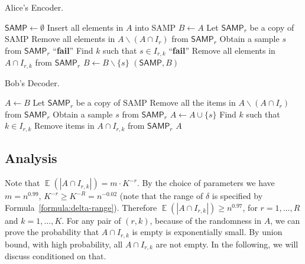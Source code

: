 \documentclass[10pt]{article}
\DeclareMathOperator*{\E}{\mathbb{E}}
\newcommand{\samp}{\textsf{SAMP}\xspace}
\newcommand{\enc}{\textsf{ENC}\xspace}
\newcommand{\dec}{\textsf{DEC}\xspace}
\begin{document}
\begin{algorithm}[H]
  \caption{Alice's Encoder.}
  \begin{algorithmic}[1]
    \Procedure{$\enc_4$}{$A$}
    \State $\samp \leftarrow \emptyset$
    \State Insert all elements in $A$ into \samp
    \State $B\leftarrow A$
      \State Let $\samp_r$ be a copy of \samp
      \State Remove all elements in $A\backslash (A\cap I_r)$ from $\samp_r$
        \State Obtain a sample $s$ from $\samp_r$ 
          \State \Return ``\textbf{fail}'' \label{algo-enc_4:sampler-wrong}
        \EndIf
        \State Find $k$ such that $s\in I_{r,k}$ 
          \State \Return ``\textbf{fail}'' \label{algo-enc_4:kill-wrong}
        \EndIf
        \State Remove all elements in $A\cap I_{r,k}$ from $\samp_r$
        \State $B \leftarrow B \backslash \{s\}$
      \EndFor
    \EndFor
    \State \Return $(\samp, B)$ 
    \EndProcedure
  \end{algorithmic}
\end{algorithm}


\begin{algorithm}[H]
  \caption{Bob's Decoder.}
  \begin{algorithmic}[1]
    \Procedure{$\dec_4$}{\samp, $B$}
    \State $A\leftarrow B$
      \State Let $\samp_r$ be a copy of \samp 
      \State Remove all the items in $A\backslash (A\cap I_r)$ from $\samp_r$
      \State Obtain a sample $s$ from $\samp_r$
      \State $A\leftarrow A \cup \{s\}$
      \State Find $k$ such that $k\in I_{r,k}$
      \State Remove items in $A\cap I_{r,k}$ from $\samp_r$
      \EndFor
    \EndFor
    \State \Return $A$ 
    \EndProcedure
  \end{algorithmic}
\end{algorithm}

\subsection{Analysis} 

Note that $\E(|A\cap I_{r,k}|)=m\cdot K^{-r}$. By the choice of parameters we have $m=n^{0.99}$, $K^{-r}\ge K^{-R}=n^{-0.02}$ (note that the range of $\delta$ is specified by Formula~\ref{formula:delta-range}). Therefore $\E(|A\cap I_{r,k}|) \ge n^{0.97}$, for $r=1,\ldots, R$ and $k=1,\ldots, K$. For any pair of $(r,k)$, because of the randomness in $A$, we can prove the probability that $A\cap I_{r,k}$ is empty is exponentially small. By union bound, with high probability, all $A\cap I_{r,k}$ are not empty. In the following, we will discuss conditioned on that.
\end{document}
